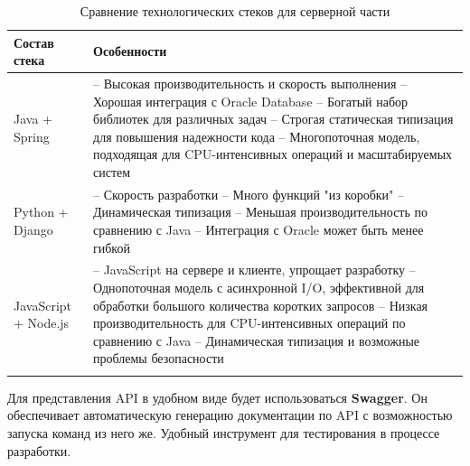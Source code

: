\documentclass[a4paper,article]{article}
\begin{document}
    \begin{xltabular}{\textwidth} { |
        >{\hsize} X |
        >{\hsize} X | }

        \hline
        Состав стека
        & Особенности \\

        \hline
        Java + Spring
        & -- Высокая производительность и скорость выполнения \newline -- Хорошая интеграция с Oracle Database \newline -- Богатый набор библиотек для различных задач \newline -- Строгая статическая типизация для повышения надежности кода \newline -- Многопоточная модель, подходящая для CPU-интенсивных операций и масштабируемых систем \\

        \hline
        Python + Django
        & -- Скорость разработки \newline -- Много функций "из коробки" \newline -- Динамическая типизация \newline -- Меньшая производительность по сравнению с Java \newline -- Интеграция с Oracle может быть менее гибкой \\

        \hline
        JavaScript + Node.js
        & -- JavaScript на сервере и клиенте, упрощает разработку \newline -- Однопоточная модель с асинхронной I/O, эффективной для обработки большого количества коротких запросов \newline -- Низкая производительность для CPU-интенсивных операций по сравнению с Java \newline -- Динамическая типизация и возможные проблемы безопасности \\

        \hline

        \caption{\centering Сравнение технологических стеков для серверной части}

        \label{tab:Сравнение технологических стеков для серверной части}
    \end{xltabular}

    Для представления API в удобном виде будет использоваться \textbf{Swagger}. Он обеспечивает автоматическую генерацию документации по API с возможностью запуска команд из него же. Удобный инструмент для тестирования в процессе разработки.
\end{document}

